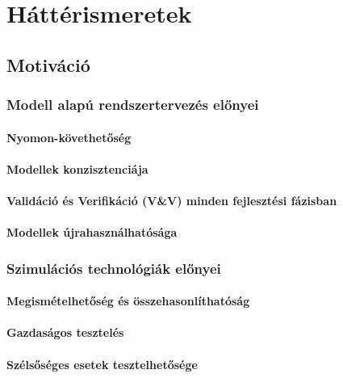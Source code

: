 \chapter{Háttérismeretek}

\section{Motiváció}

    \subsection{Modell alapú rendszertervezés előnyei}

        \subsubsection{Nyomon-követhetőség}

        \subsubsection{Modellek konzisztenciája}

        \subsubsection{Validáció és Verifikáció (V\&V) minden fejlesztési fázisban}

        \subsubsection{Modellek újrahasználhatósága}

    \subsection{Szimulációs technológiák előnyei}

        \subsubsection{Megismételhetőség és összehasonlíthatóság}

        \subsubsection{Gazdaságos tesztelés}

        \subsubsection{Szélsőséges esetek tesztelhetősége}

